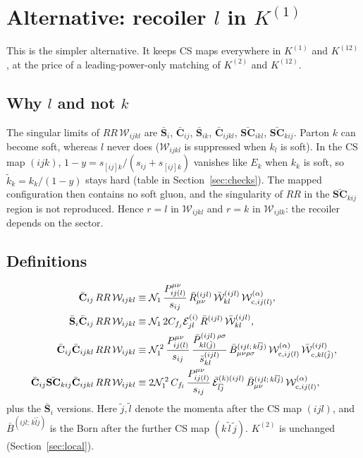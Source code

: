 \documentclass[11pt,a4paper]{article}
\newcommand{\bbC}[1]{\bar{\mathbf C}_{#1}}
\newcommand{\bbS}[1]{\bar{\mathbf S}_{#1}}
\newcommand{\bbSC}[1]{\bar{\mathbf{SC}}_{#1}}
\newcommand{\RR}{RR}
\newcommand{\W}[1]{\mathcal W_{#1}}
\newcommand{\bW}[1]{\bar{\mathcal W}_{#1}}
\newcommand{\E}[3]{\mathcal E^{(#1)}_{#2#3}}
\newcommand{\Norms}{\mathcal N_1^{\,2}}
\begin{document}
\appendix
\section{Alternative: recoiler $l$ in $K^{(1)}$}
\label{app:l}

This is the simpler alternative. It keeps CS maps everywhere in $K^{(1)}$ and $K^{(12)}$,
at the price of a leading-power-only matching of $K^{(2)}$ and $K^{(12)}$.

\subsection{Why $l$ and not $k$}
The singular limits of $\RR\,\W{ijkl}$ are $\bbS{i}$, $\bbC{ij}$, $\bbS{ik}$, $\bbC{ijkl}$, $\bbSC{ikl}$, $\bbSC{kij}$.
Parton $k$ can become soft, whereas $l$ never does ($\W{ijkl}$ is suppressed when $k_l$ is soft).
In the CS map $(ijk)$, $1-y=s_{[ij]k}/(s_{ij}+s_{[ij]k})$ vanishes like $E_k$ when $k_k$ is soft, so
$\tilde k_k=k_k/(1-y)$ stays hard (table in Section~\ref{sec:checks}). The mapped configuration then
contains no soft gluon, and the singularity of $\RR$ in the $\bbSC{kij}$ region is not reproduced.
Hence $r=l$ in $\W{ijkl}$ and $r=k$ in $\W{ijlk}$: the recoiler depends on the sector.

\subsection{Definitions}
\begin{align}
\bbC{ij}\,\RR\,\W{ijkl}&\equiv
\mathcal N_1\,\frac{P^{\mu\nu}_{ij(l)}}{s_{ij}}\,\bar R^{(ijl)}_{\mu\nu}\,
\bW{kl}^{(ijl)}\,\W{{\rm c},ij(l)}^{(\alpha)},\\
\bbS{i}\bbC{ij}\,\RR\,\W{ijkl}&\equiv \mathcal N_1\,2C_{f_j}\E{i}{j}{l}\,\bar R^{(ijl)}\,\bW{kl}^{(ijl)},\\
\bbC{ij}\bbC{ijkl}\,\RR\,\W{ijkl}
&\equiv\Norms\,\frac{P^{\mu\nu}_{ij(l)}}{s_{ij}}\,
\frac{\bar P^{(ijl)\,\rho\sigma}_{kl(\tilde j)}}{\bar s^{(ijl)}_{kl}}\,
\bar B^{(ijl;\,k\tilde l\tilde j)}_{\mu\nu\rho\sigma}\,
\W{{\rm c},ij(l)}^{(\alpha)}\,\bW{{\rm c},kl(\tilde j)}^{(ijl)},\\
\bbC{ij}\bbSC{kij}\bbC{ijkl}\,\RR\,\W{ijkl}
&\equiv 2\Norms\,C_{f_l}\,\frac{P^{\mu\nu}_{ij(l)}}{s_{ij}}\,
\bar{\mathcal E}^{(k)(ijl)}_{\tilde l\tilde j}\,\bar B^{(ijl;\,k\tilde l\tilde j)}_{\mu\nu}\,
\W{{\rm c},ij(l)}^{(\alpha)},
\end{align}
plus the $\bbS{i}$ versions. Here $\tilde j,\tilde l$ denote the momenta after the CS map $(ijl)$, and
$\bar B^{(ijl;\,k\tilde l\tilde j)}$ is the Born after the further CS map $(k\,\tilde l\,\tilde j)$.
$K^{(2)}$ is unchanged (Section~\ref{sec:local}).
\end{document}
